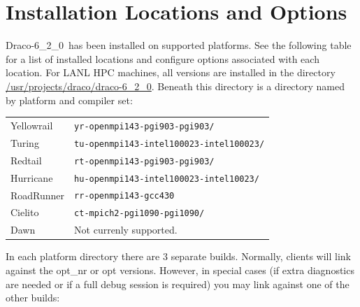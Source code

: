 \documentclass[note]{ResearchNote_pdf}
\newcommand{\draco}{Draco}
\newcommand{\dracor}{\draco-6\_2\_0}
\begin{document}

\section{Installation Locations and Options}

\dracor\ has been installed on supported platforms.  See the following
table for a list of installed locations and configure options
associated with each location.  For LANL HPC machines, all versions
are installed in the directory \url{/usr/projects/draco/draco-6_2_0}.
Beneath this directory is a directory named by platform and compiler
set: 
%
\begin{center}
  \footnotesize
  \begin{tabular}{lp{2.5in}}
    \hline\hline
    \textsf{Yellowrail} & \texttt{yr-openmpi143-pgi903-pgi903/}  \\
    \textsf{Turing}     & \texttt{tu-openmpi143-intel100023-intel100023/}  \\
    \textsf{Redtail}    & \texttt{rt-openmpi143-pgi903-pgi903/}  \\
    \textsf{Hurricane}  & \texttt{hu-openmpi143-intel100023-intel10023/}  \\
    \textsf{RoadRunner} & \texttt{rr-openmpi143-gcc430}  \\
    \textsf{Cielito}    & \texttt{ct-mpich2-pgi1090-pgi1090/}  \\
    \textsf{Dawn}       & Not currenly supported. \\
    \hline\hline
  \end{tabular}
\end{center}
%
In each platform directory there are 3 separate builds.  Normally,
clients will link against the \textsf{opt\_nr} or \textsf{opt}
versions.  However, in special cases (if extra diagnostics are needed
or if a full debug session is required) you may link against one of
the other builds:
%
\end{document}
